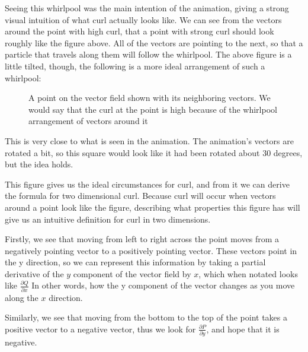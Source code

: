 \documentclass{article}
\begin{document}
    Seeing this whirlpool was the main intention of the animation, giving a strong visual intuition of what curl actually looks like.
    We can see from the vectors around the point with high curl, that a point with strong curl should look roughly like the figure above.
    All of the vectors are pointing to the next, so that a particle that travels along them will follow the whirlpool.
    The above figure is a little tilted, though, the following is a more ideal arrangement of such a whirlpool:

    \begin{figure}[!h]
        \centering
        \caption{A point on the vector field shown with its neighboring vectors. We would say that the curl at the point is high because of the whirlpool arrangement of vectors around it}
    \end{figure}

    This is very close to what is seen in the animation.
    The animation's vectors are rotated a bit, so this square would look like it had been rotated about 30 degrees, but the idea holds.

    This figure gives us the ideal circumstances for curl, and from it we can derive the formula for two dimensional curl.
    Because curl will occur when vectors around a point look like the figure, describing what properties this figure has will give us an intuitive definition for curl in two dimensions.

    Firstly, we see that moving from left to right across the point moves from a negatively pointing vector to a positively pointing vector.
    These vectors point in the y direction, so we can represent this information by taking a partial derivative of the $y$ component of the vector field by $x$, which when notated looks like
    $\frac{\partial Q}{\partial x}$
    In other words, how the y component of the vector changes as you move along the $x$ direction.

    Similarly, we see that moving from the bottom to the top of the point takes a positive vector to a negative vector, thus we look for 
    $\frac{\partial P}{ \partial y}$, and hope that it is negative.
    
\end{document}

